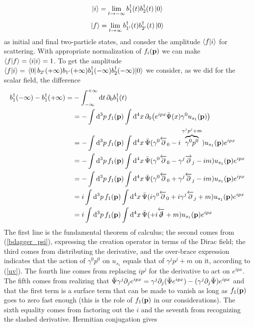 \begin{equation}
    \ket{i}=\lim _{t\to-\infty}b_1^\dagger(t) b_2^\dagger(t)\ket{0}
\end{equation}
\begin{equation}
    \ket{f}=\lim _{t\to\infty}b_{1^\prime}^\dagger(t) b_{2^\prime}^\dagger(t)\ket{0}
\end{equation}
as initial and final two-particle states, and consder the amplitude $\braket{f}{i}$ for scattering.
With appropriate normalization of $f_i(\vb{p})$ we can make $\braket{f}=\braket{i}=1$. To get the amplitude $\braket{f}{i}=\vev{\,b_{2^\prime}(+\infty)b_{1^\prime}(+\infty)b_1^\dagger(-\infty)b_2^\dagger(-\infty)}$ we consider, as we did for the scalar field, the difference
\begin{equation}
    \begin{aligned}
    b_1^\dagger(-\infty)-b_1^\dagger(+\infty)=&-\int_{-\infty}^{+\infty}\dd t\,\partial_0b_1^\dagger(t)\\
    &=-\int\dd^3 p\, f_1(\vb{p})\int \dd^4 x\,\partial_0\qty(e^{ipx}\Bar{\Psi}(x)\gamma^0u_{s_1}(\vb{p}))\\
    &=-\int\dd^3 p\, f_1(\vb{p})\int \dd^4x\,\Bar{\Psi}(\gamma^0\overleftarrow{\partial}_0-i\overbrace{\gamma^0p^0}^{\gamma^jp^j+m})u_{s_1}(\vb{p})e^{ipx}\\
    &=-\int\dd^3 p\, f_1(\vb{p})\int \dd^4x\,\Bar{\Psi}(\gamma^0\overleftarrow{\partial}_0-\gamma^j\overrightarrow{\partial}_j-im)u_{s_1}(\vb{p})e^{ipx}\\
    &=-\int\dd^3 p\, f_1(\vb{p})\int \dd^4x\,\Bar{\Psi}(\gamma^0\overleftarrow{\partial}_0+\gamma^j\overleftarrow{\partial}_j-im)u_{s_1}(\vb{p})e^{ipx}\\
    &=i\int\dd^3 p\, f_1(\vb{p})\int \dd^4x\,\Bar{\Psi}(i\gamma^0\overleftarrow{\partial}_0+i\gamma^j\overleftarrow{\partial}_j+m)u_{s_1}(\vb{p})e^{ipx}\\
    &=i\int\dd^3 p\, f_1(\vb{p})\int \dd^4x\,\Bar{\Psi}(+i\overleftarrow{\slashed{\partial}}+m)u_{s_1}(\vb{p})e^{ipx}\\
    \end{aligned}
    \label{b1_spinor}
\end{equation}
The first line is the fundamental theorem of calculus; the second comes from (\ref{bdagger_psi}), expressing the creation operator in terms of the Dirac field; the third comes from distributing the derivative, and the over-brace expression indicates that the action of $\gamma^0p^0$ on $u_{s_1}$ equals that of $\gamma^jp^j+m$ on it, according to (\ref{uv}). The fourth line comes from replacing $ip^j$ for the derivative to act on $e^{ipx}$. The fifth comes from realizing that $\Bar{\Psi}\gamma^j\partial_je^{ipx}=\gamma^j\partial_j(\Bar{\Psi} e^{ipx})-(\gamma^j\partial_j\Bar{\Psi})e^{ipx}$ and that the first term is a surface term that can be made to vanish as long as $f_1(\vb{p})$ goes to zero fast enough (this is the role of $f_1(\vb{p})$ in our considerations). The sixth equality comes from factoring out the $i$ and the seventh from recognizing the slashed derivative. Hermitian conjugation gives 
